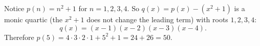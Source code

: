 Notice $p(n)=n^2+1$ for $n=1,2,3,4$. So $q(x)=p(x)-(x^2+1)$ is a monic quartic (the $x^2+1$ does not change the leading term) with roots $1,2,3,4$:
\[
q(x)=(x-1)(x-2)(x-3)(x-4).
\]
Therefore $p(5)=4\cdot3\cdot2\cdot1+5^2+1=24+26=\boxed{50}$.
